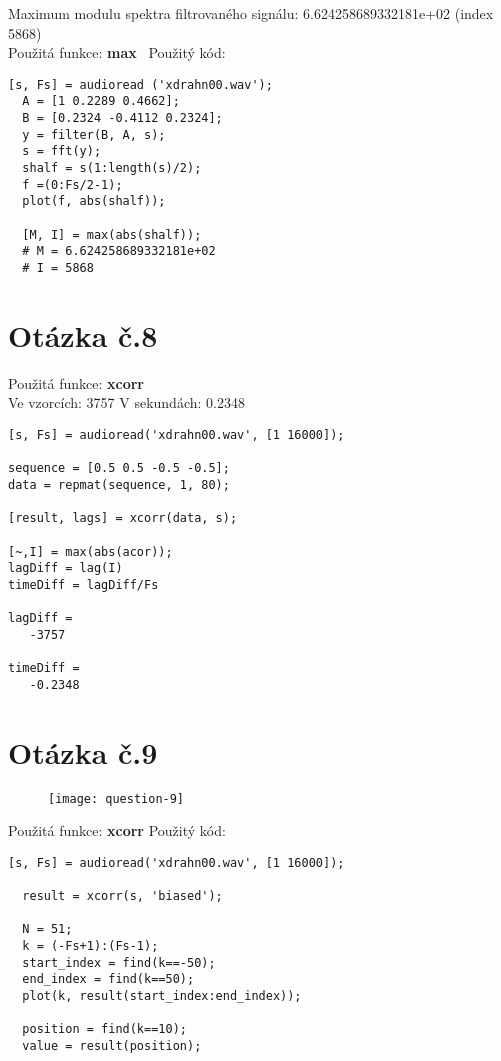 \documentclass[a4paper,11pt]{article}
\begin{document}
Maximum modulu spektra filtrovaného signálu: 6.624258689332181e+02 (index 5868)\\
\newline
Použitá funkce: \textbf{max}\
\newline
\newline
Použitý kód:
\lstset{language=Matlab}
\begin{lstlisting}[frame=single,breaklines]
  [s, Fs] = audioread ('xdrahn00.wav');
  A = [1 0.2289 0.4662];
  B = [0.2324 -0.4112 0.2324];
  y = filter(B, A, s);
  s = fft(y);
  shalf = s(1:length(s)/2);
  f =(0:Fs/2-1);
  plot(f, abs(shalf));

  [M, I] = max(abs(shalf));
  # M = 6.624258689332181e+02
  # I = 5868
\end{lstlisting}

\section{Otázka č.8}

Použitá funkce: \textbf{xcorr}\\
\newline
Ve vzorcích: 3757
\newline
V sekundách: 0.2348
\newline

\lstset{language=Matlab}
\begin{lstlisting}[frame=single,breaklines]
[s, Fs] = audioread('xdrahn00.wav', [1 16000]);

sequence = [0.5 0.5 -0.5 -0.5];
data = repmat(sequence, 1, 80);

[result, lags] = xcorr(data, s);

[~,I] = max(abs(acor));
lagDiff = lag(I)
timeDiff = lagDiff/Fs

lagDiff =
   -3757

timeDiff =
   -0.2348

\end{lstlisting}

\section{Otázka č.9}

\begin{figure}[H]
  \centering
  \texttt{[image: question-9]}
\end{figure}

Použitá funkce: \textbf{xcorr}
\newline
\newline
Použitý kód:
\lstset{language=Matlab}
\begin{lstlisting}[frame=single,breaklines]
  [s, Fs] = audioread('xdrahn00.wav', [1 16000]);

  result = xcorr(s, 'biased');

  N = 51;
  k = (-Fs+1):(Fs-1);
  start_index = find(k==-50);
  end_index = find(k==50);
  plot(k, result(start_index:end_index));

  position = find(k==10);
  value = result(position);
\end{lstlisting}
\end{document}

